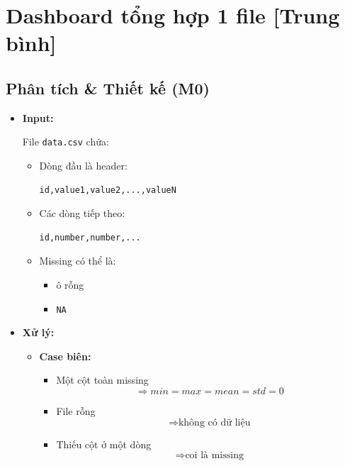 \section{Dashboard tổng hợp 1 file [Trung bình]}
\subsection{Phân tích \& Thiết kế (M0)}

\begin{itemize}

    \item \textbf{Input:}

    File \texttt{data.csv} chứa:

    \begin{itemize}
        \item Dòng đầu là header:
\begin{lstlisting}
id,value1,value2,...,valueN
\end{lstlisting}

        \item Các dòng tiếp theo:
\begin{lstlisting}
id,number,number,...
\end{lstlisting}

        \item Missing có thể là:
        \begin{itemize}
            \item ô rỗng
            \item \texttt{NA}
        \end{itemize}
    \end{itemize}

    \item \textbf{Xử lý:}

    \begin{itemize}

        \item \textbf{Case biên:}

        \begin{itemize}
            \item Một cột toàn missing
            \[
                \Rightarrow
                min=max=mean=std=0
            \]

            \item File rỗng
            \[
                \Rightarrow \text{không có dữ liệu}
            \]

            \item Thiếu cột ở một dòng
            \[
                \Rightarrow \text{coi là missing}
            \]
        \end{itemize}


\end{itemize}
\end{itemize}
